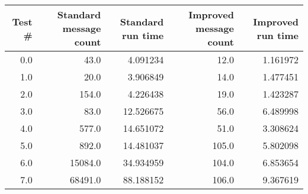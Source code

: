 \begin{tabular}{rrrrr}
\toprule
 Test \# &  Standard message count &  Standard run time &  Improved message count &  Improved run time \\
\midrule
    0.0 &                    43.0 &           4.091234 &                    12.0 &           1.161972 \\
    1.0 &                    20.0 &           3.906849 &                    14.0 &           1.477451 \\
    2.0 &                   154.0 &           4.226438 &                    19.0 &           1.423287 \\
    3.0 &                    83.0 &          12.526675 &                    56.0 &           6.489998 \\
    4.0 &                   577.0 &          14.651072 &                    51.0 &           3.308624 \\
    5.0 &                   892.0 &          14.481037 &                   105.0 &           5.802098 \\
    6.0 &                 15084.0 &          34.934959 &                   104.0 &           6.853654 \\
    7.0 &                 68491.0 &          88.188152 &                   106.0 &           9.367619 \\
\bottomrule
\end{tabular}
